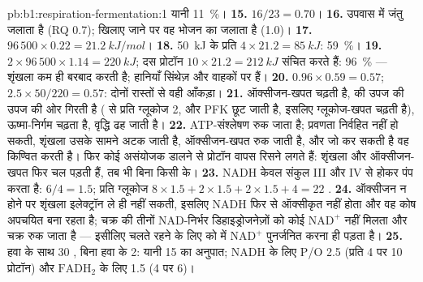 \begin{solution}{pb:b1:respiration-fermentation:1}
यानी \qty{11}{\%}।
\textbf{15.} $16/23 = 0.70$।
\textbf{16.} उपवास में जंतु  जलाता है (RQ 0.7); खिलाए जाने पर वह
भोजन का  जलाता है (1.0)।
\textbf{17.} $96\,500\times 0.22 = \qty{21.2}{kJ/mol}$।
\textbf{18.} \qty{50}{kJ} के प्रति  $4\times 21.2 = \qty{85}{kJ}$:
\qty{59}{\%}।
\textbf{19.} $2\times 96\,500\times 1.14 = \qty{220}{kJ}$; दस प्रोटॉन
$10\times 21.2 = \qty{212}{kJ}$ संचित करते हैं: \qty{96}{\%} --- शृंखला
कम ही बरबाद करती है; हानियाँ सिंथेज़ और वाहकों पर हैं।
\textbf{20.} $0.96\times 0.59 = 0.57$; $2.5\times 50/220 = 0.57$: दोनों
रास्तों से वही आँकड़ा।
\textbf{21.} ऑक्सीजन-खपत चढ़ती है,  की उपज  की उपज की ओर गिरती
है ( से प्रति ग्लूकोज 2, और PFK छूट जाती है, इसलिए
ग्लूकोज-खपत चढ़ती है), ऊष्मा-निर्गम चढ़ता है, वृद्धि ढह जाती है।
\textbf{22.} ATP-संश्लेषण रुक जाता है; प्रवणता निर्वहित नहीं हो सकती,
शृंखला उसके सामने अटक जाती है, ऑक्सीजन-खपत रुक जाती है, और  जो
कर सकती है वह किण्वित करती है। फिर कोई असंयोजक डालने से प्रोटॉन वापस रिसने
लगते हैं: शृंखला और ऑक्सीजन-खपत फिर चल पड़ती हैं, तब भी बिना किसी  के।
\textbf{23.} NADH केवल संकुल III और IV से होकर पंप करता है: $6/4 = 1.5$;
प्रति ग्लूकोज $8\times 1.5 + 2\times 1.5 + 2\times 1.5 + 4 = 22$ .
\textbf{24.} ऑक्सीजन न होने पर शृंखला इलेक्ट्रॉन ले ही नहीं सकती, इसलिए
NADH फिर से ऑक्सीकृत नहीं होता और वह कोष अपचयित बना रहता है; चक्र की
तीनों NAD-निर्भर डिहाइड्रोजनेज़ों को कोई $\mathrm{NAD^+}$ नहीं मिलता और
चक्र रुक जाता है --- इसीलिए  चलते रहने के लिए  को
 में $\mathrm{NAD^+}$ पुनर्जनित करना ही पड़ता है।
\textbf{25.} हवा के साथ 30 , बिना हवा के 2: यानी 15 का अनुपात; NADH
के लिए P/O 2.5 (प्रति  4 पर 10 प्रोटॉन) और $\mathrm{FADH_2}$ के लिए
1.5 (4 पर 6)।
\end{solution}
